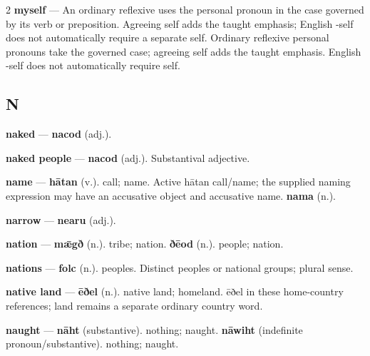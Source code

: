 \begin{multicols}{2}
\textbf{myself} — An ordinary reflexive uses the personal pronoun in the case governed by its verb or preposition. Agreeing self adds the taught emphasis; English -self does not automatically require a separate self. Ordinary reflexive personal pronouns take the governed case; agreeing self adds the taught emphasis. English -self does not automatically require self.\par
\subsection*{N}
\textbf{naked} — \textbf{nacod} (adj.).\par
\textbf{naked people} — \textbf{nacod} (adj.). Substantival adjective.\par
\textbf{name} — \textbf{hātan} (v.). call; name. Active hātan call/name; the supplied naming expression may have an accusative object and accusative name. \textbf{nama} (n.).\par
\textbf{narrow} — \textbf{nearu} (adj.).\par
\textbf{nation} — \textbf{mǣgð} (n.). tribe; nation. \textbf{ðēod} (n.). people; nation.\par
\textbf{nations} — \textbf{folc} (n.). peoples. Distinct peoples or national groups; plural sense.\par
\textbf{native land} — \textbf{ēðel} (n.). native land; homeland. ēðel in these home-country references; land remains a separate ordinary country word.\par
\textbf{naught} — \textbf{nāht} (substantive). nothing; naught. \textbf{nāwiht} (indefinite pronoun/substantive). nothing; naught.\par

\end{multicols}
